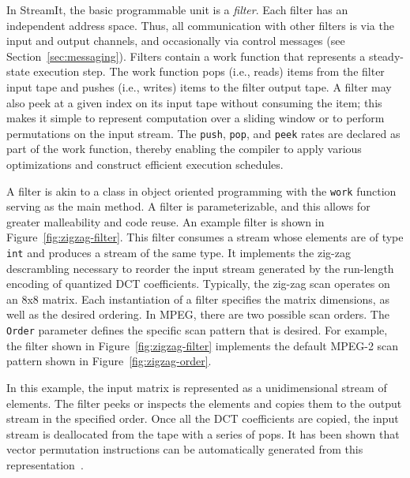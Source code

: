In StreamIt, the basic programmable unit is a {\it filter}.  Each
filter has an independent address space. Thus, all communication with
other filters is via the input and output channels, and occasionally
via control messages (see Section~\ref{sec:messaging}).  Filters
contain a work function that represents a steady-state execution step.
The work function pops (i.e., reads) items from the filter input tape
and pushes (i.e., writes) items to the filter output tape. A filter
may also peek at a given index on its input tape without consuming the
item; this makes it simple to represent computation over a sliding
window or to perform permutations on the input stream. The {\tt push},
{\tt pop}, and {\tt peek} rates are declared as part of the work
function, thereby enabling the compiler to apply various optimizations
and construct efficient execution schedules.

A filter is akin to a class in object oriented programming with the
{\tt work} function serving as the main method. A filter is parameterizable,
and this allows for greater malleability and code reuse. An example
filter is shown in Figure~\ref{fig:zigzag-filter}. This filter
consumes a stream whose elements are of type {\tt int} and produces a
stream of the same type. It implements the zig-zag descrambling
necessary to reorder the input stream generated by the run-length
encoding of quantized DCT coefficients. Typically, the zig-zag scan
operates on an 8x8 matrix. Each instantiation of a filter specifies the
matrix dimensions, as well as the desired ordering. In MPEG, there are
two possible scan orders. The {\tt Order} parameter defines the
specific scan pattern that is desired. For example, the filter shown
in Figure~\ref{fig:zigzag-filter} implements the default MPEG-2 scan
pattern shown in Figure~\ref{fig:zigzag-order}.

In this example, the input matrix is represented as a unidimensional
stream of elements. The filter peeks or inspects the elements and
copies them to the output stream in the specified order. Once all the
DCT coefficients are copied, the input stream is deallocated from the
tape with a series of pops.  It has been shown that vector permutation
instructions can be automatically generated from this
representation~\cite{yelick04msp}.

